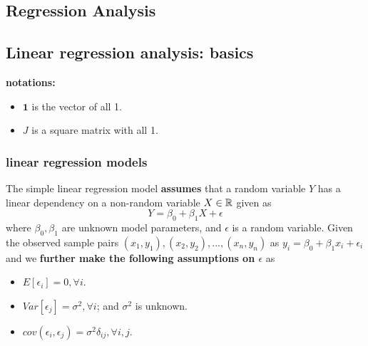 
\begin{refsection}
	\startcontents[chapters]	

\chapter{Regression Analysis}\label{ch:regression-analysis}


\section{Linear regression analysis: basics}\label{ch:theory-of-statistics:sec:linear-regression-analysis}
\begin{mdframed}
	\textbf{notations:}
	\begin{itemize}
		\item $\bm{1}$ is the vector of all 1.
		\item $J$ is a square matrix with all 1.
	\end{itemize}
\end{mdframed}


\subsection{linear regression models}
\begin{definition}
	The simple linear regression model \textbf{assumes} that a random variable $Y$ has a linear dependency on a non-random variable $X \in \mathbb{R}$ given as
	$$Y = \beta_0 + \beta_1 X + \epsilon$$
	where $\beta_0,\beta_1$ are unknown model parameters, and $\epsilon$ is a random variable. 
	Given the observed sample pairs $(x_1,y_1),(x_2,y_2),..., (x_n,y_n)$ as $y_i = \beta_0 + \beta_1 x_i + \epsilon_i$ and we \textbf{further make the following assumptions on $\epsilon$} as
	\begin{itemize}
		\item $E[\epsilon_i] = 0,\forall i$.
		\item $Var[\epsilon_j] = \sigma^2,\forall i$; and $\sigma^2$ is unknown.
		\item $cov(\epsilon_i,\epsilon_j) =\sigma^2 \delta_{ij},\forall i,j$.
	\end{itemize} 	
\end{definition}



\end{refsection}
